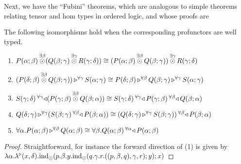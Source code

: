 \documentclass{llncs}
\begin{document}
Next, we have the ``Fubini'' theorems, which are analogous to simple
theorems relating tensor and hom types in ordered logic, and whose proofs are 
\begin{lemma}[{Fubini}]
  \label{lem:fubini-short}
  The following isomorphisms hold when the corresponding profunctors
  are well typed.
  \begin{enumerate}
  \item $\tensorexistsXwithYandZ {\beta} {\harrapp P \alpha \beta} {(\tensorexistsXwithYandZ \gamma {\harrapp Q \beta \gamma} {\harrapp R \gamma \delta})} \cong \tensorexistsXwithYandZ {\gamma} {(\tensorexistsXwithYandZ \beta {\harrapp P \alpha \beta} {\harrapp Q \beta \gamma})} {\harrapp R \gamma \delta}$
  \item $\homrallXYtoZ {\gamma} {(\tensorexistsXwithYandZ \beta {\harrapp P \delta \beta} {\harrapp Q \beta \gamma})} {\harrapp S \alpha \gamma} \cong \homrallXYtoZ \beta {\harrapp P \delta \beta} {\homrallXYtoZ \gamma {\harrapp Q \beta \gamma} {\harrapp S \alpha \gamma}}$
  \item $\homlallXYtoZ {\gamma} {(\tensorexistsXwithYandZ \beta {\harrapp P \gamma \beta} {\harrapp Q \beta \alpha})} {\harrapp S \gamma \delta} \cong \homlallXYtoZ \beta {\harrapp Q \beta \alpha} {\homlallXYtoZ \gamma {\harrapp P \gamma \beta} {\harrapp S \gamma \delta}}$
  \item $\homrallXYtoZ \gamma {\harrapp Q \delta \gamma} {(\homlallXYtoZ \beta {\harrapp P \beta \alpha} {\harrapp S \beta \gamma})} \cong \homlallXYtoZ \beta {\harrapp P \beta \alpha} {(\homrallXYtoZ \gamma {\harrapp Q \delta \gamma} {\harrapp S \beta \gamma})}$
  \item $\pendallXdotY \alpha \homrallXYtoZ \beta {\harrapp P \alpha \beta} {\harrapp Q \alpha \beta} \cong \pendallXdotY \beta \homlallXYtoZ \alpha {\harrapp P \alpha \beta} {\harrapp Q \alpha \beta}$
  \end{enumerate}  
\end{lemma}
\begin{proof}
  Straightforward, for instance the forward direction of (1) is given
  by $\lambdaunary \alpha {x} \delta {\tensorelimWkontZ x
    {p.\beta.y. \tensorelimWkontZ y
      {q.\gamma.r. \tensorintroatXwithYandZ {\gamma}
        {\tensorintroatXwithYandZ \beta p q} {r}}}}$
\end{proof}
\end{document}
